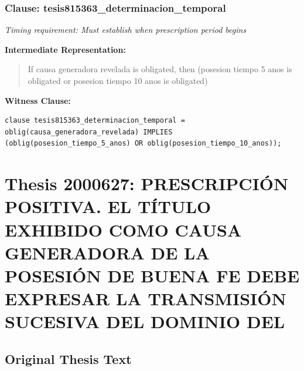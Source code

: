 \documentclass[11pt,a4paper]{article}
\begin{document}
\subsubsection{Clause: tesis815363\_determinacion\_temporal}

\textit{Timing requirement: Must establish when prescription period begins}

\textbf{Intermediate Representation:}

\begin{quote}
If causa generadora revelada is obligated, then (posesion tiempo 5 anos is obligated or posesion tiempo 10 anos is obligated)
\end{quote}

\textbf{Witness Clause:}

\begin{lstlisting}[style=witnessstyle, language=Witness]
clause tesis815363_determinacion_temporal = oblig(causa_generadora_revelada) IMPLIES (oblig(posesion_tiempo_5_anos) OR oblig(posesion_tiempo_10_anos));
\end{lstlisting}

\newpage

\section{Thesis 2000627: PRESCRIPCIÓN POSITIVA. EL TÍTULO EXHIBIDO COMO CAUSA GENERADORA DE LA POSESIÓN DE BUENA FE DEBE EXPRESAR LA TRANSMISIÓN SUCESIVA DEL DOMINIO DEL}
\label{thesis:2000627}

\subsection{Original Thesis Text}
\end{document}
